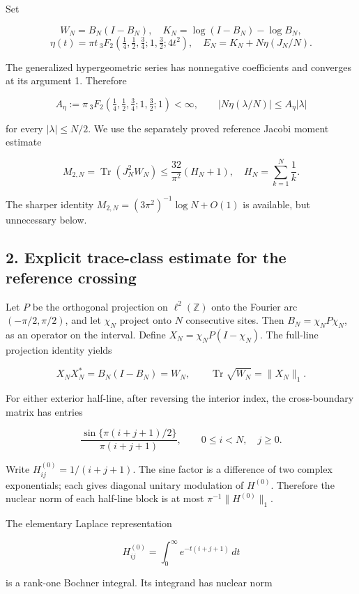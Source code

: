 \documentclass[
  10pt,
  a4paper,
]{article}
\begin{document}
Set

\[
W_N=B_N(I-B_N),\quad K_N=\log(I-B_N)-\log B_N,
\] \[
\eta(t)=\pi t\,{}_3F_2\left(\tfrac14,\tfrac12,\tfrac34;1,\tfrac32;4t^2\right),\quad E_N=K_N+N\eta(J_N/N).
\]

The generalized hypergeometric series has nonnegative coefficients and converges at its argument 1. Therefore

\[
A_\eta:=\pi\,{}_3F_2\left(\tfrac14,\tfrac12,\tfrac34;1,\tfrac32;1\right)<\infty,
\qquad |N\eta(\lambda/N)|\le A_\eta|\lambda|
\]

for every \(|\lambda|\le N/2\). We use the separately proved reference Jacobi moment estimate

\[
M_{2,N}=\operatorname{Tr}(J_N^2W_N)\le\frac{32}{\pi^2}(H_N+1),\quad H_N=\sum_{k=1}^N\frac1k.
\tag{1}
\]

The sharper identity \(M_{2,N}=(3\pi^2)^{-1}\log N+O(1)\) is available, but unnecessary below.

\subsection{2. Explicit trace-class estimate for the reference crossing}\label{explicit-trace-class-estimate-for-the-reference-crossing}

Let \(P\) be the orthogonal projection on \(\ell^2(\mathbb Z)\) onto the Fourier arc \((-\pi/2,\pi/2)\), and let \(\chi_N\) project onto \(N\) consecutive sites. Then \(B_N=\chi_NP\chi_N\), as an operator on the interval. Define \(X_N=\chi_NP(I-\chi_N)\). The full-line projection identity yields

\[
X_NX_N^*=B_N(I-B_N)=W_N,
\qquad \operatorname{Tr}\sqrt{W_N}=\|X_N\|_1.
\tag{2}
\]

For either exterior half-line, after reversing the interior index, the cross-boundary matrix has entries

\[
\frac{\sin\{\pi(i+j+1)/2\}}{\pi(i+j+1)},
\qquad 0\le i<N,\quad j\ge0.
\]

Write \(H^{(0)}_{ij}=1/(i+j+1)\). The sine factor is a difference of two complex exponentials; each gives diagonal unitary modulation of \(H^{(0)}\). Therefore the nuclear norm of each half-line block is at most \(\pi^{-1}\|H^{(0)}\|_1\).

The elementary Laplace representation

\[
H^{(0)}_{ij}=\int_0^\infty e^{-t(i+j+1)}\,dt
\]

is a rank-one Bochner integral. Its integrand has nuclear norm
\end{document}
